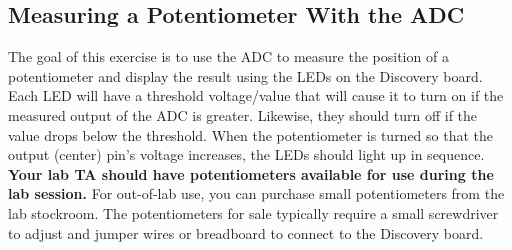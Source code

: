 \documentclass[11pt,fleqn]{book} %
\begin{document}
\subsection{Measuring a Potentiometer With the ADC}
The goal of this exercise is to use the ADC to measure the position of a potentiometer and display the result using the LEDs on the Discovery board. Each LED will have a threshold voltage/value that will cause it to turn on if the measured output of the ADC is greater. Likewise, they should turn off if the value drops below the threshold. When the potentiometer is turned so that the output (center) pin's voltage increases, the LEDs should light up in sequence. \\ 

\textbf{Your lab TA should have potentiometers available for use during the lab session.} For out-of-lab use, you can purchase small potentiometers from the lab stockroom. The potentiometers for sale typically require a small screwdriver to adjust and jumper wires or breadboard to connect to the Discovery board. 
\end{document}
